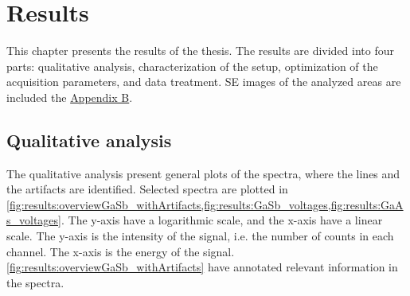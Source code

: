 \chapter{Results}
\label{ch:results}




This chapter presents the results of the thesis.
The results are divided into four parts: qualitative analysis, characterization of the setup, optimization of the acquisition parameters, and data treatment.
SE images of the analyzed areas are included the \hyperref[appendix:SE_images]{Appendix B}.



\section{Qualitative analysis}
\label{results:qualitative_analysis}

The qualitative analysis present general plots of the spectra, where the lines and the artifacts are identified.
Selected spectra are plotted in \cref{fig:results:overviewGaSb_withArtifacts,fig:results:GaSb_voltages,fig:results:GaAs_voltages}.
The y-axis have a logarithmic scale, and the x-axis have a linear scale.
The y-axis is the intensity of the signal, i.e. the number of counts in each channel.
The x-axis is the energy of the signal.
\cref{fig:results:overviewGaSb_withArtifacts} have annotated relevant information in the spectra.


